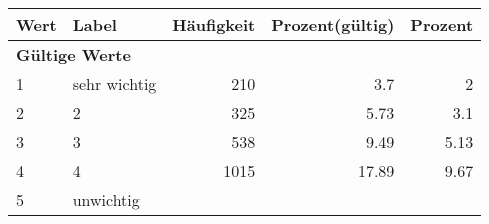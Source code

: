      \begin{longtable}{lXrrr}
     \toprule
     \textbf{Wert} & \textbf{Label} & \textbf{Häufigkeit} & \textbf{Prozent(gültig)} & \textbf{Prozent} \\
     \endhead
     \midrule
     \multicolumn{5}{l}{\textbf{Gültige Werte}}\\

     1 &
     \multicolumn{1}{X}{ sehr wichtig   } &


       \num{210} &
       \num[round-mode=places,round-precision=2]{3.7} &
         \num[round-mode=places,round-precision=2]{2} \\

     2 &
     \multicolumn{1}{X}{ 2   } &


       \num{325} &
       \num[round-mode=places,round-precision=2]{5.73} &
         \num[round-mode=places,round-precision=2]{3.1} \\

     3 &
     \multicolumn{1}{X}{ 3   } &


       \num{538} &
       \num[round-mode=places,round-precision=2]{9.49} &
         \num[round-mode=places,round-precision=2]{5.13} \\

     4 &
     \multicolumn{1}{X}{ 4   } &


       \num{1015} &
       \num[round-mode=places,round-precision=2]{17.89} &
         \num[round-mode=places,round-precision=2]{9.67} \\

     5 &
     \multicolumn{1}{X}{ unwichtig   } &



\end{longtable}
